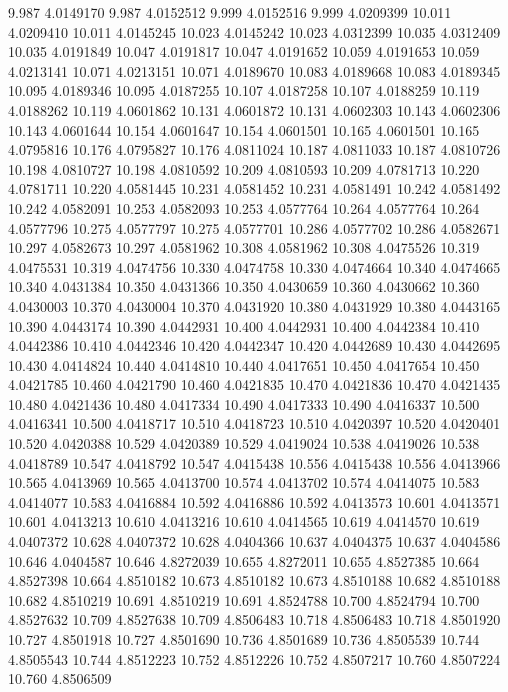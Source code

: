 9.987 4.0149170
9.987 4.0152512
9.999 4.0152516
9.999 4.0209399
10.011 4.0209410
10.011 4.0145245
10.023 4.0145242
10.023 4.0312399
10.035 4.0312409
10.035 4.0191849
10.047 4.0191817
10.047 4.0191652
10.059 4.0191653
10.059 4.0213141
10.071 4.0213151
10.071 4.0189670
10.083 4.0189668
10.083 4.0189345
10.095 4.0189346
10.095 4.0187255
10.107 4.0187258
10.107 4.0188259
10.119 4.0188262
10.119 4.0601862
10.131 4.0601872
10.131 4.0602303
10.143 4.0602306
10.143 4.0601644
10.154 4.0601647
10.154 4.0601501
10.165 4.0601501
10.165 4.0795816
10.176 4.0795827
10.176 4.0811024
10.187 4.0811033
10.187 4.0810726
10.198 4.0810727
10.198 4.0810592
10.209 4.0810593
10.209 4.0781713
10.220 4.0781711
10.220 4.0581445
10.231 4.0581452
10.231 4.0581491
10.242 4.0581492
10.242 4.0582091
10.253 4.0582093
10.253 4.0577764
10.264 4.0577764
10.264 4.0577796
10.275 4.0577797
10.275 4.0577701
10.286 4.0577702
10.286 4.0582671
10.297 4.0582673
10.297 4.0581962
10.308 4.0581962
10.308 4.0475526
10.319 4.0475531
10.319 4.0474756
10.330 4.0474758
10.330 4.0474664
10.340 4.0474665
10.340 4.0431384
10.350 4.0431366
10.350 4.0430659
10.360 4.0430662
10.360 4.0430003
10.370 4.0430004
10.370 4.0431920
10.380 4.0431929
10.380 4.0443165
10.390 4.0443174
10.390 4.0442931
10.400 4.0442931
10.400 4.0442384
10.410 4.0442386
10.410 4.0442346
10.420 4.0442347
10.420 4.0442689
10.430 4.0442695
10.430 4.0414824
10.440 4.0414810
10.440 4.0417651
10.450 4.0417654
10.450 4.0421785
10.460 4.0421790
10.460 4.0421835
10.470 4.0421836
10.470 4.0421435
10.480 4.0421436
10.480 4.0417334
10.490 4.0417333
10.490 4.0416337
10.500 4.0416341
10.500 4.0418717
10.510 4.0418723
10.510 4.0420397
10.520 4.0420401
10.520 4.0420388
10.529 4.0420389
10.529 4.0419024
10.538 4.0419026
10.538 4.0418789
10.547 4.0418792
10.547 4.0415438
10.556 4.0415438
10.556 4.0413966
10.565 4.0413969
10.565 4.0413700
10.574 4.0413702
10.574 4.0414075
10.583 4.0414077
10.583 4.0416884
10.592 4.0416886
10.592 4.0413573
10.601 4.0413571
10.601 4.0413213
10.610 4.0413216
10.610 4.0414565
10.619 4.0414570
10.619 4.0407372
10.628 4.0407372
10.628 4.0404366
10.637 4.0404375
10.637 4.0404586
10.646 4.0404587
10.646 4.8272039
10.655 4.8272011
10.655 4.8527385
10.664 4.8527398
10.664 4.8510182
10.673 4.8510182
10.673 4.8510188
10.682 4.8510188
10.682 4.8510219
10.691 4.8510219
10.691 4.8524788
10.700 4.8524794
10.700 4.8527632
10.709 4.8527638
10.709 4.8506483
10.718 4.8506483
10.718 4.8501920
10.727 4.8501918
10.727 4.8501690
10.736 4.8501689
10.736 4.8505539
10.744 4.8505543
10.744 4.8512223
10.752 4.8512226
10.752 4.8507217
10.760 4.8507224
10.760 4.8506509
